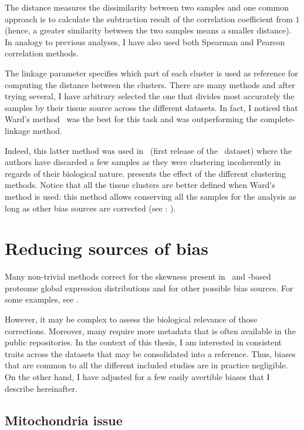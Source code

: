 The distance measures the dissimilarity between two samples and one common
approach is to calculate the subtraction result of
the correlation coefficient from $1$ (hence, a greater similarity between the two
samples means a smaller distance).
In analogy to previous analyses, I have also used both Spearman
and Pearson correlation methods.\mybr\

The linkage parameter specifies which part of each cluster is used as reference
for computing the distance between the clusters. There are many methods and after
trying several, I have arbitrary selected the one that divides most accurately
the samples by their tissue source across the different datasets.
In fact, I noticed that Ward's method~
was the best for this task and was outperforming the complete-linkage method.\mybr\

Indeed, this latter method was used in~
(first release of the \uhlen\ dataset) where
the authors have discarded a few samples as they were clustering
incoherently in regards of their biological nature.
 presents the effect of the different clustering
methods.
Notice that all the tissue clusters are better defined when Ward's
method is used:
this method allows conserving all the samples for the analysis
as long as other bias sources are corrected (see : ).\mybr\

\section{Reducing sources of bias}\label{sec:bias_sources}

Many non-trivial methods correct for the skewness present in
\Rnaseq\ and \ms-based proteome global expression distributions
and for other possible bias sources.
For some examples, see \citet{batchEffect,Leek2014-bl,Yi2018-rv,Li2014-cv,Stegle2012-td}.\mybr\

However, it may be complex to assess the biological relevance of those corrections.
Moreover, many require more metadata that is often available in the public
repositories.
In the context of this thesis, I am interested in
consistent traits across the datasets that may be consolidated into a reference.
Thus, biases that are common to all the different included studies are in practice
negligible.
On the other hand, I have adjusted for a few easily avertible biases
that I describe hereinafter.\mybr\

\subsection{Mitochondria issue}\label{subsec:mito}

